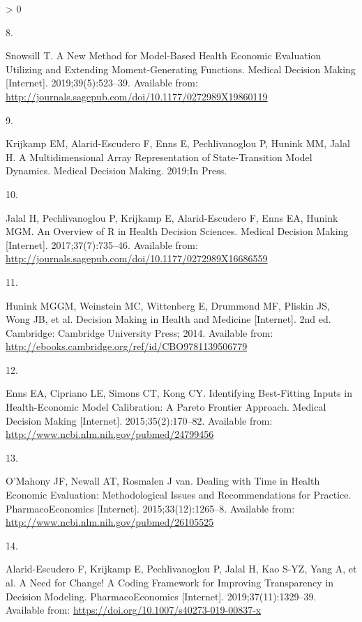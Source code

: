 \documentclass[
]{article}
\newlength{\cslhangindent}
\newlength{\csllabelwidth}
\newenvironment{CSLReferences}[2] %
 {%
  \setlength{\parindent}{0pt}
  \ifodd #1 \everypar{\setlength{\hangindent}{\cslhangindent}}\ignorespaces\fi
  \ifnum #2 > 0
  \setlength{\parskip}{#2\baselineskip}
  \fi
 }%
 {}
\newcommand{\CSLLeftMargin}[1]{\parbox[t]{\csllabelwidth}{#1}}
\newcommand{\CSLRightInline}[1]{\parbox[t]{\linewidth - \csllabelwidth}{#1}\break}
\begin{document}
\begin{CSLReferences}{0}{0}
\leavevmode\hypertarget{ref-Snowsill2019}{}%
\CSLLeftMargin{8. }
\CSLRightInline{Snowsill T. {A New Method for Model-Based Health Economic Evaluation Utilizing and Extending Moment-Generating Functions}. Medical Decision Making {[}Internet{]}. 2019;39(5):523--39. Available from: \url{http://journals.sagepub.com/doi/10.1177/0272989X19860119}}

\leavevmode\hypertarget{ref-Krijkamp2019}{}%
\CSLLeftMargin{9. }
\CSLRightInline{Krijkamp EM, Alarid-Escudero F, Enns E, Pechlivanoglou P, Hunink MM, Jalal H. {A Multidimensional Array Representation of State-Transition Model Dynamics}. Medical Decision Making. 2019;In Press. }

\leavevmode\hypertarget{ref-Jalal2017b}{}%
\CSLLeftMargin{10. }
\CSLRightInline{Jalal H, Pechlivanoglou P, Krijkamp E, Alarid-Escudero F, Enns EA, Hunink MGM. {An Overview of R in Health Decision Sciences}. Medical Decision Making {[}Internet{]}. 2017;37(7):735--46. Available from: \url{http://journals.sagepub.com/doi/10.1177/0272989X16686559}}

\leavevmode\hypertarget{ref-Hunink2014}{}%
\CSLLeftMargin{11. }
\CSLRightInline{Hunink MGGM, Weinstein MC, Wittenberg E, Drummond MF, Pliskin JS, Wong JB, et al. {Decision Making in Health and Medicine} {[}Internet{]}. 2nd ed. Cambridge: Cambridge University Press; 2014. Available from: \url{http://ebooks.cambridge.org/ref/id/CBO9781139506779}}

\leavevmode\hypertarget{ref-Enns2015e}{}%
\CSLLeftMargin{12. }
\CSLRightInline{Enns EA, Cipriano LE, Simons CT, Kong CY. {Identifying Best-Fitting Inputs in Health-Economic Model Calibration: A Pareto Frontier Approach}. Medical Decision Making {[}Internet{]}. 2015;35(2):170--82. Available from: \url{http://www.ncbi.nlm.nih.gov/pubmed/24799456}}

\leavevmode\hypertarget{ref-OMahony2015}{}%
\CSLLeftMargin{13. }
\CSLRightInline{O'Mahony JF, Newall AT, Rosmalen J van. {Dealing with Time in Health Economic Evaluation: Methodological Issues and Recommendations for Practice.} PharmacoEconomics {[}Internet{]}. 2015;33(12):1265--8. Available from: \url{http://www.ncbi.nlm.nih.gov/pubmed/26105525}}

\leavevmode\hypertarget{ref-Alarid-Escudero2019e}{}%
\CSLLeftMargin{14. }
\CSLRightInline{Alarid-Escudero F, Krijkamp E, Pechlivanoglou P, Jalal H, Kao S-YZ, Yang A, et al. {A Need for Change! A Coding Framework for Improving Transparency in Decision Modeling}. PharmacoEconomics {[}Internet{]}. 2019;37(11):1329--39. Available from: \url{https://doi.org/10.1007/s40273-019-00837-x}}


\end{CSLReferences}
\end{document}
